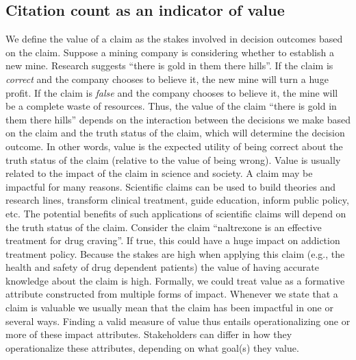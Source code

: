 \documentclass[
  english,
  jou,floatsintext]{apa6}
\begin{document}
\hypertarget{citation-count-as-an-indicator-of-value}{%
\subsection{Citation count as an indicator of value}\label{citation-count-as-an-indicator-of-value}}

We define the value of a claim as the stakes involved in decision outcomes based on the claim. Suppose a mining company is considering whether to establish a new mine. Research suggests ``there is gold in them there hills''. If the claim is \emph{correct} and the company chooses to believe it, the new mine will turn a huge profit. If the claim is \emph{false} and the company chooses to believe it, the mine will be a complete waste of resources. Thus, the value of the claim ``there is gold in them there hills'' depends on the interaction between the decisions we make based on the claim and the truth status of the claim, which will determine the decision outcome. In other words, value is the expected utility of being correct about the truth status of the claim (relative to the value of being wrong). Value is usually related to the impact of the claim in science and society. A claim may be impactful for many reasons. Scientific claims can be used to build theories and research lines, transform clinical treatment, guide education, inform public policy, etc. The potential benefits of such applications of scientific claims will depend on the truth status of the claim. Consider the claim ``naltrexone is an effective treatment for drug craving''. If true, this could have a huge impact on addiction treatment policy. Because the stakes are high when applying this claim (e.g., the health and safety of drug dependent patients) the value of having accurate knowledge about the claim is high. Formally, we could treat value as a formative attribute constructed from multiple forms of impact. Whenever we state that a claim is valuable we usually mean that the claim has been impactful in one or several ways. Finding a valid measure of value thus entails operationalizing one or more of these impact attributes. Stakeholders can differ in how they operationalize these attributes, depending on what goal(s) they value.
\end{document}
